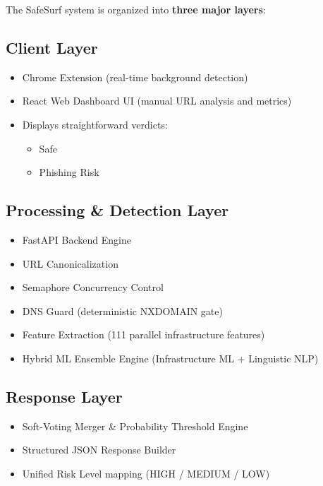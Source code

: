 The SafeSurf system is organized into \textbf{three major layers}:

\subsection{Client Layer}

\begin{itemize}
    \item Chrome Extension (real-time background detection)
    \item React Web Dashboard UI (manual URL analysis and metrics)
    \item Displays straightforward verdicts:
    \begin{itemize}
        \item Safe
        \item Phishing Risk
    \end{itemize}
\end{itemize}

\subsection{Processing \& Detection Layer}

\begin{itemize}
    \item FastAPI Backend Engine
    \item URL Canonicalization
    \item Semaphore Concurrency Control
    \item DNS Guard (deterministic NXDOMAIN gate)
    \item Feature Extraction (111 parallel infrastructure features)
    \item Hybrid ML Ensemble Engine (Infrastructure ML + Linguistic NLP)
\end{itemize}

\subsection{Response Layer}

\begin{itemize}
    \item Soft-Voting Merger \& Probability Threshold Engine
    \item Structured JSON Response Builder
    \item Unified Risk Level mapping (HIGH / MEDIUM / LOW)
\end{itemize}

